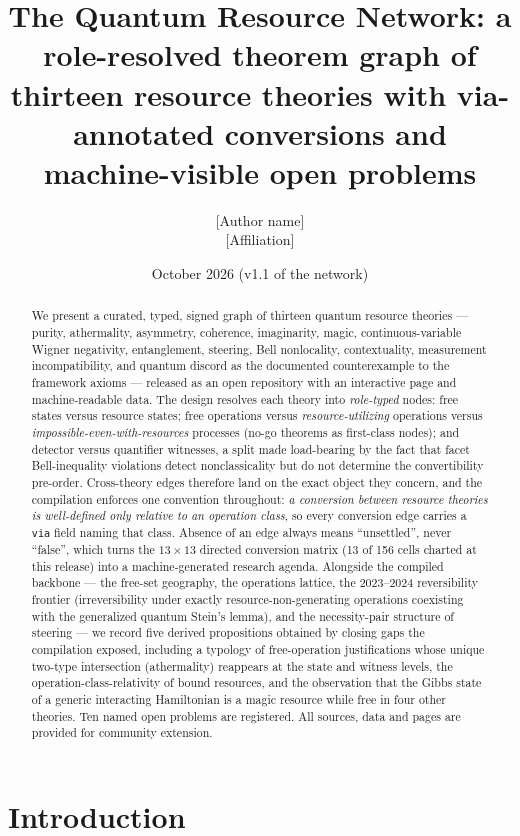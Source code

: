 \documentclass[11pt,a4paper]{article}
\title{The Quantum Resource Network: a role-resolved theorem graph of
thirteen resource theories with via-annotated conversions and
machine-visible open problems}
\author{[Author name]\\ \small [Affiliation] \quad [email]}
\date{October 2026 \quad (v1.1 of the network)}
\theoremstyle{definition}
\begin{document}
\maketitle

\begin{abstract}
We present a curated, typed, signed graph of thirteen quantum resource
theories --- purity, athermality, asymmetry, coherence, imaginarity, magic,
continuous-variable Wigner negativity, entanglement, steering, Bell
nonlocality, contextuality, measurement incompatibility, and quantum discord
as the documented counterexample to the framework axioms --- released as an
open repository with an interactive page and machine-readable data. The design
resolves each theory into \emph{role-typed} nodes: free states versus resource
states; free operations versus \emph{resource-utilizing} operations versus
\emph{impossible-even-with-resources} processes (no-go theorems as first-class
nodes); and detector versus quantifier witnesses, a split made load-bearing by
the fact that facet Bell-inequality violations detect nonclassicality but do
not determine the convertibility pre-order. Cross-theory edges therefore land
on the exact object they concern, and the compilation enforces one convention
throughout: \emph{a conversion between resource theories is well-defined only
relative to an operation class}, so every conversion edge carries a
\texttt{via} field naming that class. Absence of an edge always means
``unsettled'', never ``false'', which turns the $13\times13$ directed
conversion matrix (13 of 156 cells charted at this release) into a
machine-generated research agenda. Alongside the compiled backbone --- the
free-set geography, the operations lattice, the 2023--2024 reversibility
frontier (irreversibility under exactly resource-non-generating operations
coexisting with the generalized quantum Stein's lemma), and the
necessity-pair structure of steering --- we record five derived propositions
obtained by closing gaps the compilation exposed, including a typology of
free-operation justifications whose unique two-type intersection
(athermality) reappears at the state and witness levels, the
operation-class-relativity of bound resources, and the observation that the
Gibbs state of a generic interacting Hamiltonian is a magic resource while
free in four other theories. Ten named open problems are registered. All
sources, data and pages are provided for community extension.
\end{abstract}

\section{Introduction}
\end{document}
